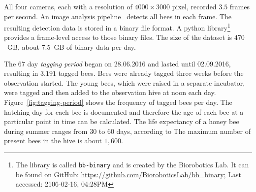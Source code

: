 All four cameras, each with a resolution of $4000\times3000$ pixel, recorded $3.5$ frames per second. 
An image analysis pipeline~\cite{wario2015automatic} detects all bees in each frame.
The resulting detection data is stored in a binary file format.
A python library\footnote{The library is called \texttt{bb-binary} and is created by the Biorobotics Lab. It can be found on GitHub: \url{https://github.com/BioroboticsLab/bb_binary}; Last accessed: 2106-02-16, 04:28PM} provides a frame-level access to those binary files.
The size of the dataset is $470$~GB, about $7.5$~GB of binary data per day.

The 67 day \emph{tagging period} began on 28.06.2016 and lasted until 02.09.2016, resulting in $3.191$ tagged bees.
Bees were already tagged three weeks before the observation started.
The young bees, which were raised in a separate incubator, were tagged and then added to the observation hive at noon each day.
Figure~\ref{fig:tagging-period} shows the frequency of tagged bees per day.
The hatching day for each bee is documented and therefore the age of each bee at a particular point in time can be calculated.
The life expectancy of a honey bee during summer ranges from 30 to 60 days, according to \textcite[p. 27]{menzel2016intelligenz}
The maximum number of present bees in the hive is about $1,600$.